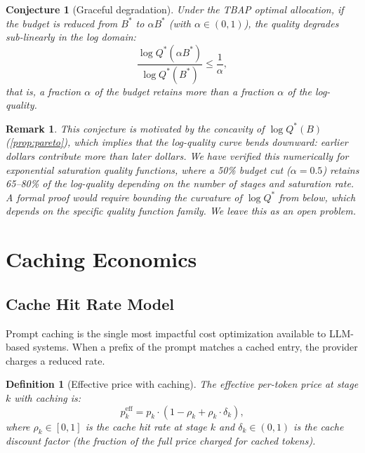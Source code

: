 \documentclass[11pt, a4paper, copyright]{googledeepmind}
\newtheorem{definition}{Definition}[section]
\newtheorem{conjecture}{Conjecture}[section]
\newtheorem*{remark}{Remark}
\begin{document}
\begin{conjecture}[Graceful degradation]\label{conj:graceful}
Under the TBAP optimal allocation, if the budget is reduced from $B^*$ to $\alpha B^*$ (with $\alpha \in (0,1)$), the quality degrades sub-linearly in the log domain:
\begin{equation}\label{eq:graceful}
    \frac{\log Q^*(\alpha B^*)}{\log Q^*(B^*)} \leq \frac{1}{\alpha},
\end{equation}
that is, a fraction $\alpha$ of the budget retains more than a fraction $\alpha$ of the log-quality.
\end{conjecture}

\begin{remark}
This conjecture is motivated by the concavity of $\log Q^*(B)$ (\cref{prop:pareto}), which implies that the log-quality curve bends downward: earlier dollars contribute more than later dollars. We have verified this numerically for exponential saturation quality functions, where a 50\% budget cut ($\alpha = 0.5$) retains 65--80\% of the log-quality depending on the number of stages and saturation rate. A formal proof would require bounding the curvature of $\log Q^*$ from below, which depends on the specific quality function family. We leave this as an open problem.
\end{remark}


\section{Caching Economics}\label{sec:caching}

\subsection{Cache Hit Rate Model}

Prompt caching is the single most impactful cost optimization available to LLM-based systems. When a prefix of the prompt matches a cached entry, the provider charges a reduced rate.

\begin{definition}[Effective price with caching]\label{def:cache-price}
The effective per-token price at stage $k$ with caching is:
\begin{equation}\label{eq:cache-price}
    p_k^{\text{eff}} = p_k \cdot \left(1 - \rho_k + \rho_k \cdot \delta_k\right),
\end{equation}
where $\rho_k \in [0,1]$ is the cache hit rate at stage $k$ and $\delta_k \in (0,1)$ is the cache discount factor (the fraction of the full price charged for cached tokens).
\end{definition}
\end{document}
